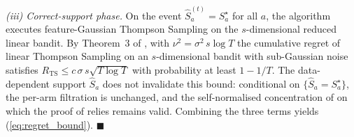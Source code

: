 \documentclass[journal,twoside,web]{ieeecolor}
\begin{document}
\emph{(iii) Correct-support phase.} On the event $\hat{S}_a^{(t)} = S^\star_a$ for all $a$, the algorithm executes feature-Gaussian Thompson Sampling on the $s$-dimensional reduced linear bandit. By Theorem~3 of \cite{abeille2017linear}, with $\nu^2 = \sigma^2\, s\log T$ the cumulative regret of linear Thompson Sampling on an $s$-dimensional bandit with sub-Gaussian noise satisfies $R_{\mathrm{TS}} \leq c\,\sigma\,s\sqrt{T\log T}$ with probability at least $1 - 1/T$. The data-dependent support $\hat{S}_a$ does not invalidate this bound: conditional on $\{\hat{S}_a = S^\star_a\}$, the per-arm filtration is unchanged, and the self-normalised concentration of \cite{abbasi2011improved} on which the proof of \cite[Thm.~3]{abeille2017linear} relies remains valid. Combining the three terms yields (\ref{eq:regret_bound}). \hfill$\blacksquare$



\end{document}
